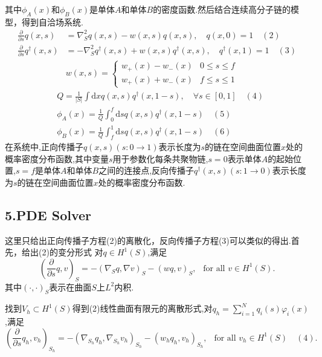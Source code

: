 \documentclass{article}
\begin{document}
其中$\phi_A(x)$和$\phi_B(x)$是单体$A$和单体$B$的密度函数.然后结合连续高分子链的模型，得到自洽场系统.
\begin{equation*}
\begin{aligned}
\frac{\partial}{\partial s}q(x,s)&=\nabla_S^2q(x,s)-w(x,s)q(x,s),\quad q(x,0)=1\quad(2)\\
\frac{\partial}{\partial s}q^{\dagger}(x,s)&=-\nabla_S^2q^{\dagger}(x,s)+w(x,s)q^{\dagger}(x,s),\quad q^{\dagger}(x,1)=1\quad(3)\\
&w(x,s)=
\begin{cases}
w_+(x) - w_-(x) & 0\le s\le f\\
w_+(x) + w_-(x) & f\le s\le 1
\end{cases}
\end{aligned}
\end{equation*}
\begin{equation*}
\begin{aligned}
&Q=\frac{1}{\left|S\right|}\int\mathrm{d}xq(x,s)q^{\dagger}(x,1-s),\quad\forall s\in[0,1]\quad(4)\\
&\phi_A(x)=\frac{1}{Q}\int_0^f\mathrm{d}sq(x,s)q^{\dagger}(x,1-s)\quad(5)\\
&\phi_B(x)=\frac{1}{Q}\int_f^1\mathrm{d}sq(x,s)q^{\dagger}(x,1-s)\quad(6)
\end{aligned}
\end{equation*}
在系统中,正向传播子$q(x,s)(s:0\rightarrow 1)$表示长度为$s$的链在空间曲面位置$x$处的概率密度分布函数,其中变量$s$用于参数化每条共聚物链,$s=0$表示单体$A$的起始位置,$s=f$是单体$A$和单体$B$之间的连接点,反向传播子$q^{\dagger}(x,s)(s:1\rightarrow 0)$表示长度为$s$的链在空间曲面位置$x$处的概率密度分布函数.
\subsection{5.PDE Solver}
这里只给出正向传播子方程(2)的离散化，反向传播子方程(3)可以类似的得出.首先，给出(2)的变分形式
对$q\in H^1(S)$,满足
\begin{equation*}
\left(\frac{\partial}{\partial s}q,v\right)_S=-(\nabla_Sq,\nabla v)_S-(wq,v)_S,~~\text{ for all } v\in H^1(S).
\end{equation*}
其中$(\cdot,\cdot)_S$表示在曲面$S$上$L^2$内积.

找到$V_h\subset H^1(S)$得到(2)线性曲面有限元的离散形式,对$q_h=\sum\limits_{i=1}^Nq_i(s)\varphi_i(x)$,满足
\begin{equation*}
\left(\frac{\partial}{\partial s}q_h,v_h\right)_{S_h}=-(\nabla_{S_h}q_h,\nabla_{S_h} v_h)_{S_h}-(w_hq_h,v_h)_{S_h},~~\text{ for all } v_h\in H^1(S)\quad(4).
\end{equation*}
\end{document}
